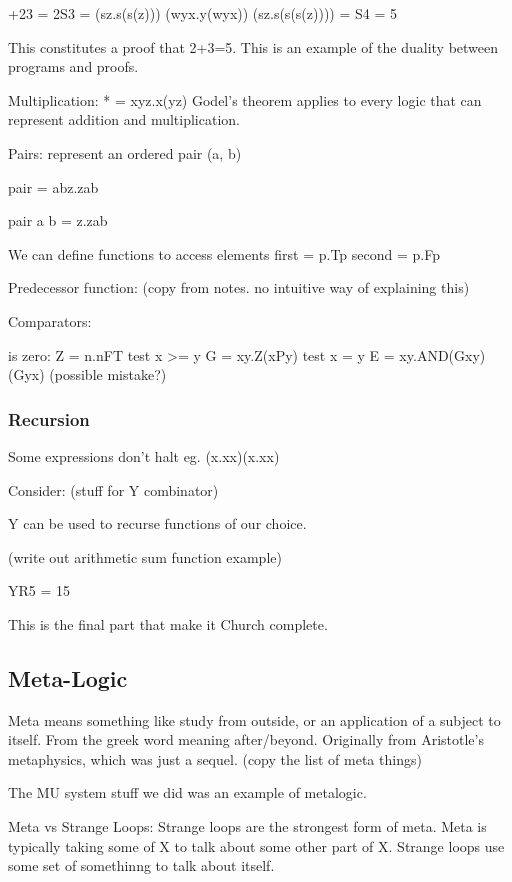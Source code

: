 \documentclass{article}
\begin{document}
+23 = 2S3 = (\lambda sz.s(s(z))) (\lambda wyx.y(wyx)) (\lambda sz.s(s(s(z))))
= S4 = 5

This constitutes a proof that 2+3=5. This is an example of the duality between programs and proofs.

Multiplication:
* = \lambda xyz.x(yz)
Godel's theorem applies to every logic that can represent addition and multiplication.

Pairs:
represent an ordered pair (a, b)

pair = \lambda abz.zab

pair a b = \lambda z.zab

We can define functions to access elements
first = \lambda p.Tp
second = \lambda p.Fp

Predecessor function:
(copy from notes. no intuitive way of explaining this)

Comparators:

is zero:
Z = \lambda n.nFT
test x >= y
G = \lambda xy.Z(xPy)
test x = y
E = \lambda xy.AND(Gxy)(Gyx) (possible mistake?)

\subsubsection{Recursion}

Some expressions don't halt
eg. (\lambda x.xx)(\lambda x.xx)

Consider:
(stuff for Y combinator)

Y can be used to recurse functions of our choice.

(write out arithmetic sum function example)

YR5 = 15

This is the final part that make it Church complete.

\subsection{Meta-Logic}

Meta means something like study from outside, or an application of a subject to itself. From the greek word meaning after/beyond.
Originally from Aristotle's metaphysics, which was just a sequel.
(copy the list of meta things)

The MU system stuff we did was an example of metalogic.

Meta vs Strange Loops:
Strange loops are the strongest form of meta. Meta is typically taking some of X to talk about some other part of X.
Strange loops use some set of somethinng to talk about itself.
\end{document}
